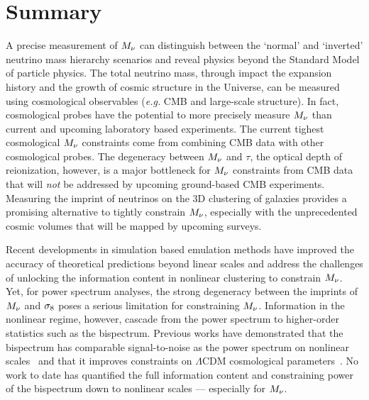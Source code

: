 \section{Summary} 
A precise measurement of $M_\nu$ can distinguish between the `normal' 
and `inverted' neutrino mass hierarchy scenarios and reveal physics 
beyond the Standard Model of particle physics. The total neutrino mass, 
through impact the  expansion history and the growth of cosmic structure 
in the Universe, can be measured using cosmological observables (\emph{e.g.} 
CMB and large-scale structure). In fact, cosmological probes have the 
potential to more precisely measure $M_\nu$ than current and upcoming 
laboratory based experiments. The current tighest cosmological $M_\nu$ 
constraints come from combining CMB data with other cosmological probes. 
The degeneracy between $M_\nu$ and $\tau$, the optical depth of reionization, 
however, is a major bottleneck for $M_\nu$ constraints from CMB data 
that will {\em not} be addressed by upcoming ground-based CMB experiments. 
Measuring the imprint of neutrinos on the 3D clustering of galaxies 
provides a promising alternative to tightly constrain $M_\nu$, especially 
with the unprecedented cosmic volumes that will be mapped by upcoming 
surveys. 

Recent developments in simulation based emulation methods have improved 
the accuracy of theoretical predictions beyond linear scales and address 
the challenges of unlocking the information content in nonlinear clustering 
to constrain $M_\nu$. Yet, for power spectrum analyses, the strong 
degeneracy between the imprints of $M_\nu$ and $\sigma_8$ poses a serious 
limitation for constraining $M_\nu$. Information in the nonlinear 
regime, however, cascade from the power spectrum to higher-order statistics 
such as the bispectrum. Previous works have demonstrated that the bispectrum
has comparable signal-to-noise as the power spectrum on nonlinear scales~\citep{sefusatti2005, chan2017}
and that it improves constraints on $\Lambda$CDM cosmological parameters~\citep{sefusatti2006, yankelevich2019}. 
No work to date has quantified the full information content and constraining 
power of the bispectrum down to nonlinear scales --- especially for $M_\nu$. 

